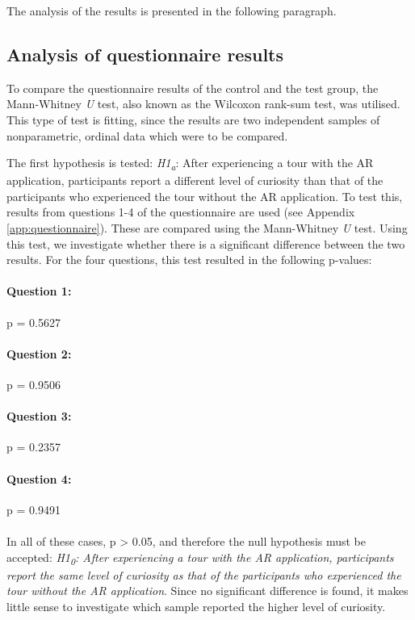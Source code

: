 The analysis of the results is presented in the following paragraph.

\subsection{Analysis of questionnaire results}\label{sec:questionnaire_analysis}
To compare the questionnaire results of the control and the test group, the Mann-Whitney \textit{U} test, also known as the Wilcoxon rank-sum test, was utilised. This type of test is fitting, since the results are two independent samples of nonparametric, ordinal data which were to be compared.
 
The first hypothesis is tested: \textit{H1\textsubscript{a}}: After experiencing a tour with the AR application, participants report a different level of curiosity than that of the participants who experienced the tour without the AR application. To test this, results from questions 1-4 of the questionnaire are used (see Appendix \ref{app:questionnaire}). These are compared using the Mann-Whitney \textit{U} test. Using this test, we investigate whether there is a significant difference between the two results. For the four questions, this test resulted in the following p-values:

\paragraph{Question 1:} p = 0.5627
\paragraph{Question 2:} p = 0.9506
\paragraph{Question 3:} p = 0.2357
\paragraph{Question 4:} p = 0.9491\\
\\
In all of these cases, p > 0.05, and therefore the null hypothesis must be accepted: \textit{H1\textsubscript{0}: After experiencing a tour with the AR application, participants report the same level of curiosity as that of the participants who experienced the tour without the AR application}. Since no significant difference is found, it makes little sense to investigate which sample reported the higher level of curiosity.

